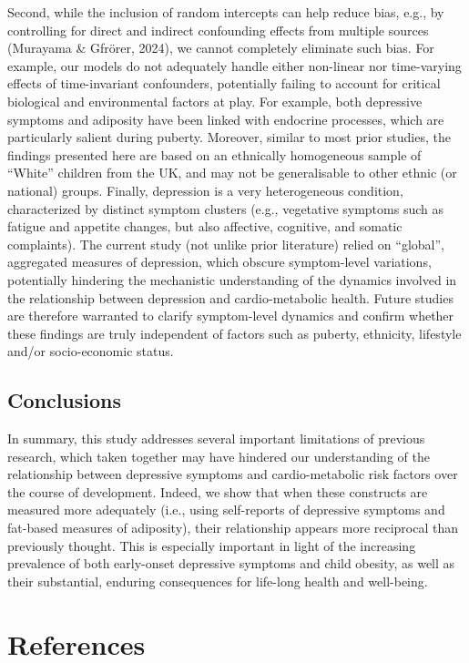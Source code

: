 \documentclass[
  letterpaper,
  DIV=11,
  numbers=noendperiod]{scrreport}
\begin{document}
Second, while the inclusion of random intercepts can help reduce bias,
e.g., by controlling for direct and indirect confounding effects from
multiple sources (Murayama \& Gfrörer, 2024), we cannot completely
eliminate such bias. For example, our models do not adequately handle
either non-linear nor time-varying effects of time-invariant
confounders, potentially failing to account for critical biological and
environmental factors at play. For example, both depressive symptoms and
adiposity have been linked with endocrine processes, which are
particularly salient during puberty. Moreover, similar to most prior
studies, the findings presented here are based on an ethnically
homogeneous sample of ``White'' children from the UK, and may not be
generalisable to other ethnic (or national) groups. Finally, depression
is a very heterogeneous condition, characterized by distinct symptom
clusters (e.g., vegetative symptoms such as fatigue and appetite
changes, but also affective, cognitive, and somatic complaints). The
current study (not unlike prior literature) relied on ``global'',
aggregated measures of depression, which obscure symptom-level
variations, potentially hindering the mechanistic understanding of the
dynamics involved in the relationship between depression and
cardio-metabolic health. Future studies are therefore warranted to
clarify symptom-level dynamics and confirm whether these findings are
truly independent of factors such as puberty, ethnicity, lifestyle
and/or socio-economic status.

\subsection{Conclusions}\label{conclusions-1}

In summary, this study addresses several important limitations of
previous research, which taken together may have hindered our
understanding of the relationship between depressive symptoms and
cardio-metabolic risk factors over the course of development. Indeed, we
show that when these constructs are measured more adequately (i.e.,
using self-reports of depressive symptoms and fat-based measures of
adiposity), their relationship appears more reciprocal than previously
thought. This is especially important in light of the increasing
prevalence of both early-onset depressive symptoms and child obesity, as
well as their substantial, enduring consequences for life-long health
and well-being.

\section*{References}\label{references-5}
\end{document}
